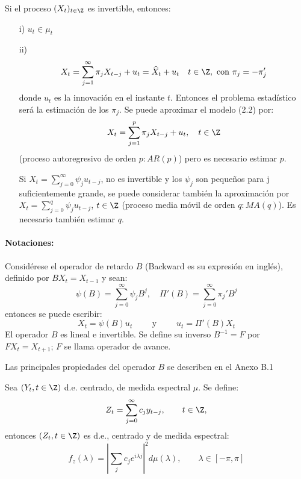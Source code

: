 \begin{observacion}
Si el proceso $(X_{t} )_{t\in \Z} $ es invertible, entonces:
\begin{enumerate}
 \item[i)] $u_{t} \in \mu_{t} $ 
 \item[ii)] \begin{equation}
        X_{t} =\sum_{j=1}^\infty {\pi_{j} X_{t-j} } +u_{t} =\widehat{X}_{t} +u_{t} \quad t\in \Z,\text{ con }\pi_{j} =-\pi_{j}'     
       \end{equation}
	donde $u_{t} $ es la innovaci\'{o}n en el instante $t$. Entonces el problema estad\'{i}stico ser\'{a} la estimaci\'{o}n de los $\pi_{j} $. Se puede aproximar el modelo (2.2) por:
	\[
	 X_{t} =\sum_{j=1}^p \pi_{j} X_{t-j} +u_{t} ,\quad t\in \Z
	\]
	(proceso autoregresivo de orden $p: AR(p)$) pero es necesario estimar $p$.

Si $\displaystyle X_{t} =\sum_{j=0}^\infty {\psi_{j} u_{t-j} } $, no es invertible y los $\psi_{j}$ son peque\~{n}os para j suficientemente grande, se puede considerar tambi\'{e}n la aproximaci\'{o}n por $\displaystyle X_{t} =\sum_{j=0}^q {\psi_{j} u_{t-j} }$, $t\in \Z$ (proceso media m\'{o}vil de orden $q: MA(q)$). Es necesario tambi\'{e}n estimar $q$.
\end{enumerate}
\end{observacion}


\paragraph{Notaciones:} Consid\'{e}rese el operador de retardo $B$ (Backward es su expresi\'{o}n en ingl\'{e}s), definido por $BX_{t} =X_{t-1} $ y sean:
\[
\psi \left( B \right)=\sum_{j=0}^\infty {\psi_{j} B^{j}} ,
\quad
\Pi'\left( B \right)=\sum_{j=0}^\infty {\pi_{j}' } B^{j}
\]
entonces se puede escribir:
\[
 X_{t} =\psi \left( B \right)u_{t}\qquad\text{ y }\qquad u_{t} =\Pi'\left( B \right)X_{t}
\]
El operador $B$ es lineal e invertible. Se define su inverso $B^{-1}=F$ por $FX_{t} =X_{t+1} $; $F$ se llama operador de avance.\newline

Las principales propiedades del operador $B$ se describen en el Anexo B.1

\begin{teorema}
 Sea $\left( {Y_{t} ,t\in \Z} \right)$ d.e. centrado, de medida espectral $\mu $. Se define:
\[
Z_{t} =\sum_{j=0}^\infty {c_{j} y_{t-j} } ,\qquad t\in \Z,
\]
entonces $\left( {Z_{t} ,t\in \Z} \right)$ es d.e., centrado y de medida espectral:
\[
f_{z} \left( \lambda \right)=\left| {\sum_j {c_{j} e^{i\lambda j}} } \right|^{2}d\mu \left( \lambda \right),\qquad \lambda \in \left[ {-\pi ,\pi } \right]
\]
\end{teorema}

